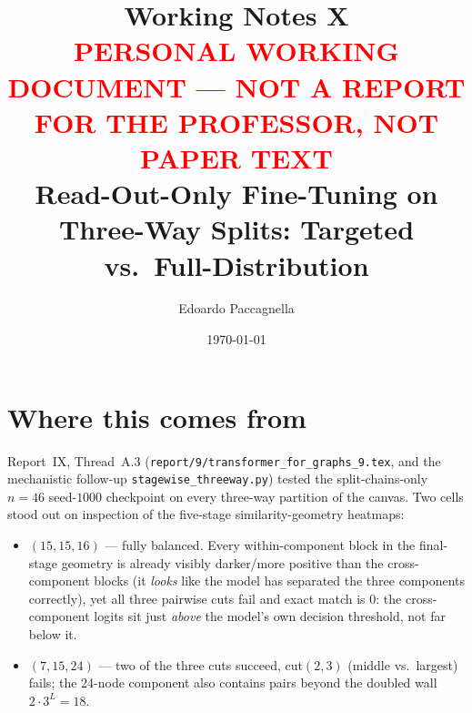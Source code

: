 \documentclass[11pt,a4paper]{article}
\title{Working Notes X \\
       \large \textcolor{red}{PERSONAL WORKING DOCUMENT --- NOT A REPORT FOR THE PROFESSOR,
       NOT PAPER TEXT} \\
       Read-Out-Only Fine-Tuning on Three-Way Splits: Targeted vs.\ Full-Distribution}
\author{Edoardo Paccagnella}
\date{\today}
\begin{document}
\maketitle

\begin{center}
\end{center}


\section{Where this comes from}
\label{sec:intro}

Report~IX, Thread~A.3 (\texttt{report/9/transformer\_for\_graphs\_9.tex}, and the mechanistic
follow-up \texttt{stagewise\_threeway.py}) tested the split-chains-only $n{=}46$ seed-$1000$
checkpoint on every three-way partition of the canvas. Two cells stood out on inspection of the
five-stage similarity-geometry heatmaps:

\begin{itemize}\setlength\itemsep{0.15em}
  \item \textbf{$(15,15,16)$} --- fully balanced. Every within-component block in the final-stage
        geometry is already visibly darker/more positive than the cross-component blocks (it
        \emph{looks} like the model has separated the three components correctly), yet all three
        pairwise cuts fail and exact match is $0$: the cross-component logits sit just
        \emph{above} the model's own decision threshold, not far below it.
  \item \textbf{$(7,15,24)$} --- two of the three cuts succeed, cut$(2,3)$ (middle vs.\ largest)
        fails; the 24-node component also contains pairs beyond the doubled wall
        $2\cdot3^L{=}18$.
\end{itemize}
\end{document}
